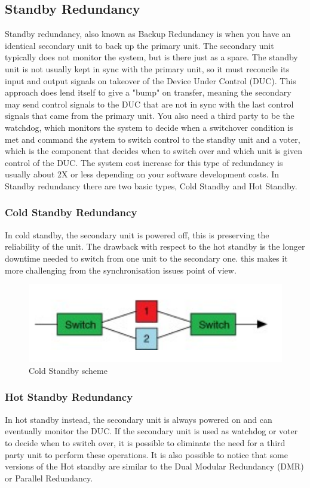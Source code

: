 \documentclass[./dissertation.tex]{subfiles}
\begin{document}
\subsection{Standby Redundancy}
Standby redundancy, also known as Backup Redundancy is when you have an identical secondary unit to back up the primary unit. The secondary unit typically does not monitor the system, but is there just as a spare. The standby unit is not usually kept in sync with the primary unit, so it must reconcile its input and output signals on takeover of the Device Under Control (DUC). This approach does lend itself to give a "bump" on transfer, meaning the secondary may send control signals to the DUC that are not in sync with the last control signals that came from the primary unit.
You also need a third party to be the watchdog, which monitors the system to decide when a switchover condition is met and command the system to switch control to the standby unit and a voter, which is the component that decides when to switch over and which unit is given control of the DUC. The system cost increase for this type of redundancy is usually about 2X or less depending on your software development costs. In Standby redundancy there are two basic types, Cold Standby and Hot Standby. \cite{bib12}

\subsubsection{Cold Standby Redundancy} In cold standby, the secondary unit is powered off, this is preserving the reliability of the unit. The drawback with respect to the hot standby is the longer downtime needed to switch from one unit to the secondary one. this makes it more challenging from the synchronisation issues point of view.

\begin{figure}[h!]
\centering
  \includegraphics[scale = 0.50]{imgs/coldred.png}
  \caption{Cold Standby scheme }
  \label{fig:coldred}
\end{figure}
\subsubsection{Hot Standby Redundancy}
In hot standby instead, the secondary unit is always powered on and can eventually monitor the DUC. If the secondary unit is used as watchdog or voter to decide when to switch over, it is possible to eliminate the need for a third party unit to perform these operations. It is also possible to notice that some versions of the Hot standby are similar to the Dual Modular Redundancy (DMR) or Parallel Redundancy.
\end{document}
